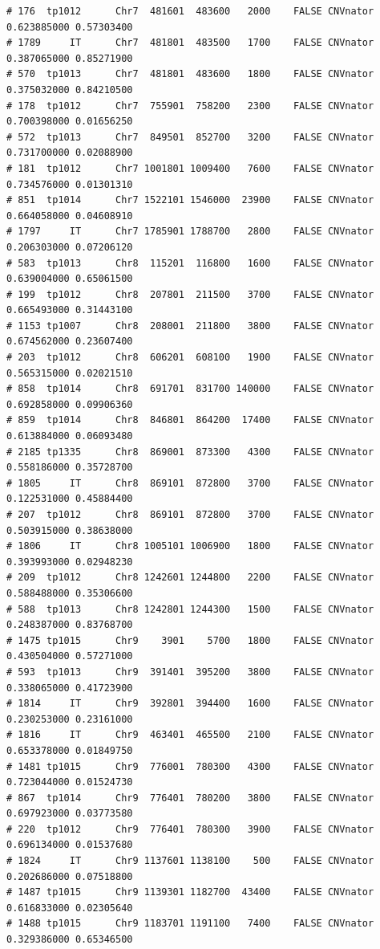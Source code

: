 \documentclass{article}\usepackage[]{graphicx}\usepackage[]{color}
\makeatletter
\newenvironment{kframe}{%
 \def\at@end@of@kframe{}%
 \ifinner\ifhmode%
  \def\at@end@of@kframe{\end{minipage}}%
  \begin{minipage}{\columnwidth}%
 \fi\fi%
 \def\FrameCommand##1{\hskip\@totalleftmargin \hskip-\fboxsep
 \colorbox{shadecolor}{##1}\hskip-\fboxsep
     \hskip-\linewidth \hskip-\@totalleftmargin \hskip\columnwidth}%
 \MakeFramed {\advance\hsize-\width
   \@totalleftmargin\z@ \linewidth\hsize
   \@setminipage}}%
 {\par\unskip\endMakeFramed%
 \at@end@of@kframe}
\newenvironment{knitrout}{}{} %
\makeatother
\begin{document}
\begin{knitrout}
\begin{kframe}
\begin{verbatim}
# 176  tp1012      Chr7  481601  483600   2000    FALSE CNVnator 0.623885000 0.57303400
# 1789     IT      Chr7  481801  483500   1700    FALSE CNVnator 0.387065000 0.85271900
# 570  tp1013      Chr7  481801  483600   1800    FALSE CNVnator 0.375032000 0.84210500
# 178  tp1012      Chr7  755901  758200   2300    FALSE CNVnator 0.700398000 0.01656250
# 572  tp1013      Chr7  849501  852700   3200    FALSE CNVnator 0.731700000 0.02088900
# 181  tp1012      Chr7 1001801 1009400   7600    FALSE CNVnator 0.734576000 0.01301310
# 851  tp1014      Chr7 1522101 1546000  23900    FALSE CNVnator 0.664058000 0.04608910
# 1797     IT      Chr7 1785901 1788700   2800    FALSE CNVnator 0.206303000 0.07206120
# 583  tp1013      Chr8  115201  116800   1600    FALSE CNVnator 0.639004000 0.65061500
# 199  tp1012      Chr8  207801  211500   3700    FALSE CNVnator 0.665493000 0.31443100
# 1153 tp1007      Chr8  208001  211800   3800    FALSE CNVnator 0.674562000 0.23607400
# 203  tp1012      Chr8  606201  608100   1900    FALSE CNVnator 0.565315000 0.02021510
# 858  tp1014      Chr8  691701  831700 140000    FALSE CNVnator 0.692858000 0.09906360
# 859  tp1014      Chr8  846801  864200  17400    FALSE CNVnator 0.613884000 0.06093480
# 2185 tp1335      Chr8  869001  873300   4300    FALSE CNVnator 0.558186000 0.35728700
# 1805     IT      Chr8  869101  872800   3700    FALSE CNVnator 0.122531000 0.45884400
# 207  tp1012      Chr8  869101  872800   3700    FALSE CNVnator 0.503915000 0.38638000
# 1806     IT      Chr8 1005101 1006900   1800    FALSE CNVnator 0.393993000 0.02948230
# 209  tp1012      Chr8 1242601 1244800   2200    FALSE CNVnator 0.588488000 0.35306600
# 588  tp1013      Chr8 1242801 1244300   1500    FALSE CNVnator 0.248387000 0.83768700
# 1475 tp1015      Chr9    3901    5700   1800    FALSE CNVnator 0.430504000 0.57271000
# 593  tp1013      Chr9  391401  395200   3800    FALSE CNVnator 0.338065000 0.41723900
# 1814     IT      Chr9  392801  394400   1600    FALSE CNVnator 0.230253000 0.23161000
# 1816     IT      Chr9  463401  465500   2100    FALSE CNVnator 0.653378000 0.01849750
# 1481 tp1015      Chr9  776001  780300   4300    FALSE CNVnator 0.723044000 0.01524730
# 867  tp1014      Chr9  776401  780200   3800    FALSE CNVnator 0.697923000 0.03773580
# 220  tp1012      Chr9  776401  780300   3900    FALSE CNVnator 0.696134000 0.01537680
# 1824     IT      Chr9 1137601 1138100    500    FALSE CNVnator 0.202686000 0.07518800
# 1487 tp1015      Chr9 1139301 1182700  43400    FALSE CNVnator 0.616833000 0.02305640
# 1488 tp1015      Chr9 1183701 1191100   7400    FALSE CNVnator 0.329386000 0.65346500
\end{verbatim}
\end{kframe}
\end{knitrout}
\end{document}
